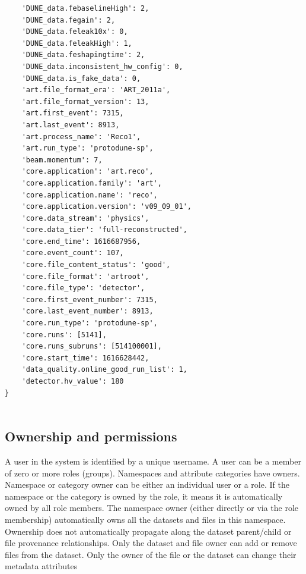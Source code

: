 \documentclass[../main-v1.tex]{subfiles}
\begin{document}
\begin{verbatim}
    'DUNE_data.febaselineHigh': 2,
    'DUNE_data.fegain': 2,
    'DUNE_data.feleak10x': 0,
    'DUNE_data.feleakHigh': 1,
    'DUNE_data.feshapingtime': 2,
    'DUNE_data.inconsistent_hw_config': 0,
    'DUNE_data.is_fake_data': 0,
    'art.file_format_era': 'ART_2011a',
    'art.file_format_version': 13,
    'art.first_event': 7315,
    'art.last_event': 8913,
    'art.process_name': 'Reco1',
    'art.run_type': 'protodune-sp',
    'beam.momentum': 7,
    'core.application': 'art.reco',
    'core.application.family': 'art',
    'core.application.name': 'reco',
    'core.application.version': 'v09_09_01',
    'core.data_stream': 'physics',
    'core.data_tier': 'full-reconstructed',
    'core.end_time': 1616687956,
    'core.event_count': 107,
    'core.file_content_status': 'good',
    'core.file_format': 'artroot',
    'core.file_type': 'detector',
    'core.first_event_number': 7315,
    'core.last_event_number': 8913,
    'core.run_type': 'protodune-sp',
    'core.runs': [5141],
    'core.runs_subruns': [514100001],
    'core.start_time': 1616628442,
    'data_quality.online_good_run_list': 1,
    'detector.hv_value': 180
}


 \end{verbatim}

\subsection{Ownership and permissions }
A  user in the system is identified  by a unique username. A user can be a member of zero or more roles (groups). Namespaces and attribute categories have owners. Namespace or category owner can be either an individual user or a role. If the namespace or the category is owned by the role, it means it is automatically owned by all role members. 
The namespace owner (either directly or via the role membership) automatically owns all the datasets and files in this namespace. Ownership does not automatically propagate along the dataset parent/child or file provenance relationships. 
Only the dataset and file owner can add or remove files from the dataset. Only the owner of the file or the dataset can change their metadata attributes 
\end{document}
